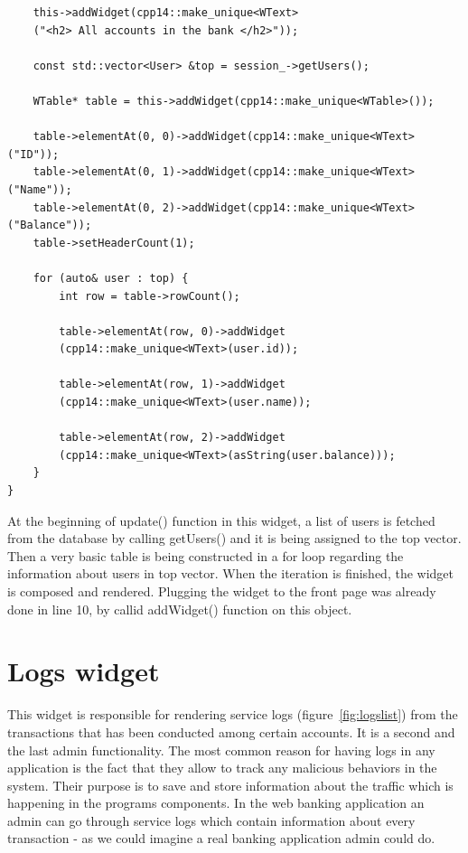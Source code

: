 \documentclass[a4paper,12pt]{book}
\begin{document}
{{\begin{lstlisting}
    this->addWidget(cpp14::make_unique<WText>
    ("<h2> All accounts in the bank </h2>"));

    const std::vector<User> &top = session_->getUsers();

    WTable* table = this->addWidget(cpp14::make_unique<WTable>());

    table->elementAt(0, 0)->addWidget(cpp14::make_unique<WText>("ID"));
    table->elementAt(0, 1)->addWidget(cpp14::make_unique<WText>("Name"));
    table->elementAt(0, 2)->addWidget(cpp14::make_unique<WText>("Balance"));
    table->setHeaderCount(1);

    for (auto& user : top) {
        int row = table->rowCount();

        table->elementAt(row, 0)->addWidget
        (cpp14::make_unique<WText>(user.id));
        
        table->elementAt(row, 1)->addWidget
        (cpp14::make_unique<WText>(user.name));
        
        table->elementAt(row, 2)->addWidget
        (cpp14::make_unique<WText>(asString(user.balance)));
    }
}
\end{lstlisting}

At the beginning of update() function in this widget, a list of users is fetched from the database by calling getUsers() and it is being assigned to the top vector. Then a very basic table is being constructed in a for loop regarding the information about users in top vector. When the iteration is finished, the widget is composed and rendered. Plugging the widget to the front page was already done in line 10, by callid addWidget() function on this object.
}

\section*{Logs widget}
{
This widget is responsible for rendering service logs (figure~\ref{fig:logslist}) from the transactions that has been conducted among certain accounts. It is a second and the last admin functionality. The most common reason for having logs in any application is the fact that they allow to track any malicious behaviors in the system. Their purpose is to save and store information about the traffic which is happening in the programs components. In the web banking application an admin can go through service logs which contain information about every transaction - as we could imagine a real banking application admin could do.

}}
\end{document}
